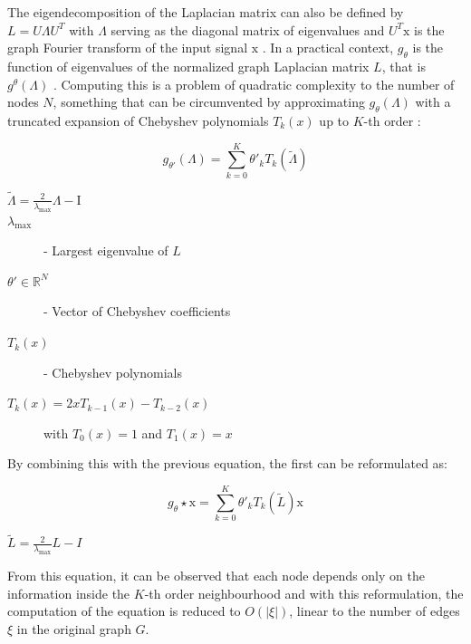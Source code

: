 The eigendecomposition of the Laplacian matrix can also be defined by $L = U \Lambda U^T$ with $\Lambda$ serving as the diagonal matrix of eigenvalues and $U^T \text{x}$ is the graph Fourier transform of the input signal $\text{x}$ \cite{tangGraphNeuralNetworks2022}. In a practical context, $g_\theta$ is the function of eigenvalues of the normalized graph Laplacian matrix $L$, that is $g^\theta(\Lambda)$ \cite{liuIntroductionGraphNeural2020, tangGraphNeuralNetworks2022}. Computing this is a problem of quadratic complexity to the number of nodes $N$, something that can be circumvented by approximating $g_\theta (\Lambda)$ with a truncated expansion of Chebyshev polynomials $T_k(x)$ up to $K$-th order \cite{liuIntroductionGraphNeural2020, tangGraphNeuralNetworks2022}:

\begin{equation}
	g_{\theta'}(\Lambda) = \sum^K_{k=0} \theta'_k T_k(\tilde{\Lambda})    
\end{equation}

\begin{description}
	\item[$\tilde{\Lambda} = \frac{2}{\lambda_\text{max}} \Lambda - \text{I}$ ]
	\item[$\lambda_\text{max}$] - Largest eigenvalue of $L$
	\item[$\theta' \in \mathbb{R}^N$] - Vector of Chebyshev coefficients
	\item[$T_k(x)$] - Chebyshev polynomials
	\item[$T_k(x) = 2 x T_{k - 1} (x) - T_{k - 2}(x)$] with $T_0(x) = 1$ and $T_1(x) = x$
\end{description}

By combining this with the previous equation, the first can be reformulated as:

\begin{equation}
	g_\theta \star \text{x} = \sum^K_{k=0} \theta'_k T_k(\tilde{L}) \text{x}
\end{equation}

\begin{description}
	\item[$\tilde{L} = \frac{2}{\lambda_\text{max}} L - I$]
\end{description}


From this equation, it can be observed that each node depends only on the information inside the $K$-th order neighbourhood and with this reformulation, the computation of the equation is reduced to $O(|\xi|)$, linear to the number of edges $\xi$ in the original graph $G$. \par

